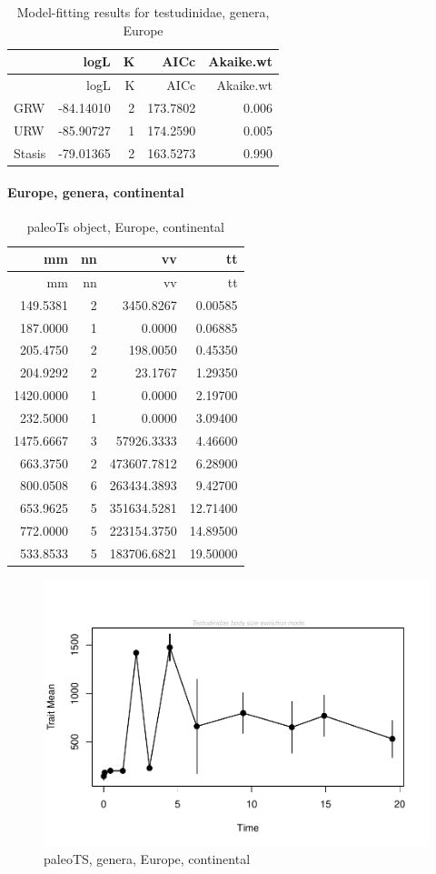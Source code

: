 \begin{longtable}[]{@{}lrrrr@{}}
	\caption{Model-fitting results for testudinidae, genera,
		Europe}
	\label{tab:pTSEuEM}\tabularnewline
	\toprule
	& logL & K & AICc & Akaike.wt\tabularnewline
	\midrule
	\endfirsthead
	\toprule
	& logL & K & AICc & Akaike.wt\tabularnewline
	\midrule
	\endhead
	GRW & -84.14010 & 2 & 173.7802 & 0.006\tabularnewline
	URW & -85.90727 & 1 & 174.2590 & 0.005\tabularnewline
	Stasis & -79.01365 & 2 & 163.5273 & 0.990\tabularnewline
	\bottomrule
\end{longtable}


\FloatBarrier
\paragraph{Europe, genera, continental}\label{europe-genera-continental}

\begin{longtable}[]{@{}rrrr@{}}
	\caption{paleoTs object, Europe, continental}
	\label{tab:pTSEuC}\tabularnewline
	\toprule
	mm & nn & vv & tt\tabularnewline
	\midrule
	\endfirsthead
	\toprule
	mm & nn & vv & tt\tabularnewline
	\midrule
	\endhead
	149.5381 & 2 & 3450.8267 & 0.00585\tabularnewline
	187.0000 & 1 & 0.0000 & 0.06885\tabularnewline
	205.4750 & 2 & 198.0050 & 0.45350\tabularnewline
	204.9292 & 2 & 23.1767 & 1.29350\tabularnewline
	1420.0000 & 1 & 0.0000 & 2.19700\tabularnewline
	232.5000 & 1 & 0.0000 & 3.09400\tabularnewline
	1475.6667 & 3 & 57926.3333 & 4.46600\tabularnewline
	663.3750 & 2 & 473607.7812 & 6.28900\tabularnewline
	800.0508 & 6 & 263434.3893 & 9.42700\tabularnewline
	653.9625 & 5 & 351634.5281 & 12.71400\tabularnewline
	772.0000 & 5 & 223154.3750 & 14.89500\tabularnewline
	533.8533 & 5 & 183706.6821 & 19.50000\tabularnewline
	\bottomrule
\end{longtable}

\begin{figure}[htbp]
	\centering
	\includegraphics{MA_JJ_files/figure-latex/pTSEuC-1.pdf}
	\caption{paleoTS, genera, Europe, continental}
	\label{fig:pTSEuC}
\end{figure}

